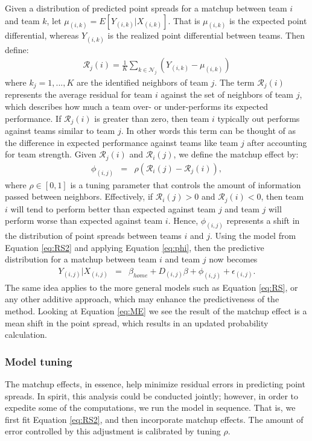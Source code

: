 \documentclass[letterpaper,12pt]{article}
\begin{document}
Given a distribution of predicted point spreads for a matchup between team $i$ and team $k$, let $\mu_{(i,k)} = E[Y_{(i,k)}|X_{(i,k)}]$. That is $\mu_{(i,k)}$ is the expected point differential, whereas $Y_{(i,k)}$ is the realized point differential between teams. Then define:
\begin{eqnarray*}
\mathcal{R}_j(i) = \frac{1}{K}\sum_{k \in \mathcal{N}_j} \left(Y_{(i,k)} - \mu_{(i,k)}\right)
\end{eqnarray*}
where $k_j = 1,...,K$ are the identified neighbors of team $j$. The term $\mathcal{R}_j(i)$ represents the average residual for team $i$ against the set of neighbors of team $j$, which describes how much a team over- or under-performs its expected performance. If $\mathcal{R}_j(i)$ is greater than zero, then team $i$ typically out performs against teams similar to team $j$. In other words this term can be thought of as the difference in expected performance against teams like team $j$ after accounting for team strength. Given $\mathcal{R}_j(i)$ and $\mathcal{R}_i(j)$, we define the matchup effect by:
\begin{eqnarray}
\phi_{(i,j)} &=& \rho(\mathcal{R}_i(j) -\mathcal{R}_j(i)),\label{eq:phi}
\end{eqnarray}
where $\rho \in [0,1]$ is a tuning parameter that controls the amount of information passed between neighbors. Effectively, if $\mathcal{R}_i(j) >0$ and $\mathcal{R}_j(i)<0$, then team $i$ will tend to perform better than expected against team $j$ and team $j$ will perform worse than expected against team $i$. Hence, $\phi_{(i,j)}$ represents a shift in the distribution of point spreads between teams $i$ and $j$. Using the model from Equation \ref{eq:RS2} and applying Equation \ref{eq:phi}, then the predictive distribution for a matchup between team $i$ and team $j$ now becomes
\begin{eqnarray}
Y_{(i,j)}|X_{(i,j)} &=& \beta_{home} +  D_{(i,j)}\beta + \phi_{(i,j)} +  \epsilon_{(i,j)} \label{eq:ME}.
\end{eqnarray}
The same idea applies to the more general models such as Equation \ref{eq:RS}, or any other additive approach, which may enhance the predictiveness of the method. Looking at Equation \ref{eq:ME} we see the result of the matchup effect is a mean shift in the point spread, which results in an updated probability calculation.

\subsubsection{Model tuning\label{sec:tuning}}
The matchup effects, in essence, help minimize residual errors in predicting point spreads. In spirit, this analysis could be conducted jointly; however, in order to expedite some of the computations, we run the model in sequence. That is, we first fit Equation \ref{eq:RS2}, and then incorporate matchup effects. The amount of error controlled by this adjustment is calibrated by tuning $\rho$. 
\end{document}
